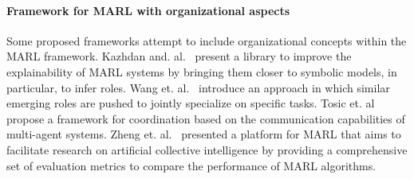 \documentclass[doubleblind]{ecai}
\begin{document}




















\paragraph{\textbf{Framework for MARL with organizational aspects}}
%
Some proposed frameworks attempt to include organizational concepts within the MARL framework.
Kazhdan and. al.~\citep{Kazhdan2020} present a library to improve the explainability of MARL systems by bringing them closer to symbolic models, in particular, to infer roles.%
%
Wang et. al.~\citep{Wang2020} introduce an approach in which similar emerging roles are pushed to jointly specialize on specific tasks.
%
Tosic et. al~\citep{Tosic2010} propose a framework for coordination based on the communication capabilities of multi-agent systems.
%
Zheng et. al.~\citep{Zheng2018} presented a platform for MARL that aims to facilitate research on artificial collective intelligence by providing a comprehensive set of evaluation metrics to compare the performance of MARL algorithms.
\end{document}
